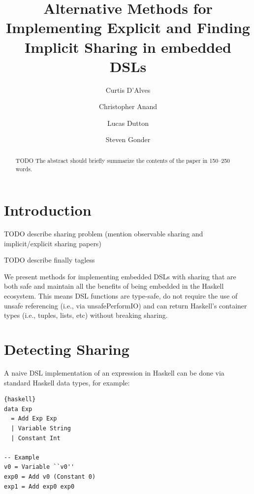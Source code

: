 \documentclass[runningheads]{llncs}
\begin{document}
\lstset{language=haskell}
%
\title{Alternative Methods for Implementing
    Explicit and Finding Implicit Sharing in embedded DSLs}
%
%
\author{Curtis D'Alves \and
Christopher Anand \and
Lucas Dutton \and
Steven Gonder
}
%
%
%
\maketitle              %
%
\begin{abstract}
TODO The abstract should briefly summarize the contents of the paper in
150--250 words.

\end{abstract}
%
%
%
\section{Introduction}

TODO describe sharing problem (mention observable sharing
\cite{gill:observablesharing} and implicit/explicit sharing
\cite{kiselyov:sharing} papers)

TODO describe finally tagless \cite{carette:finallytagless}

We present methods for implementing embedded DSLs with sharing that are both
safe and maintain all the benefits of being embedded in the Haskell ecosystem.
This means DSL functions are type-safe, do not require the use of unsafe
referencing (i.e., via unsafePerformIO) and can return Haskell's container
types (i.e., tuples, lists, etc) without breaking sharing.

\section{Detecting Sharing}

A naive DSL implementation of an expression in Haskell can be done via standard
Haskell data types, for example:

\begin{lstlisting}{haskell}
data Exp
  = Add Exp Exp
  | Variable String
  | Constant Int

-- Example
v0 = Variable ``v0''
exp0 = Add v0 (Constant 0)
exp1 = Add exp0 exp0
\end{lstlisting}
\end{document}
